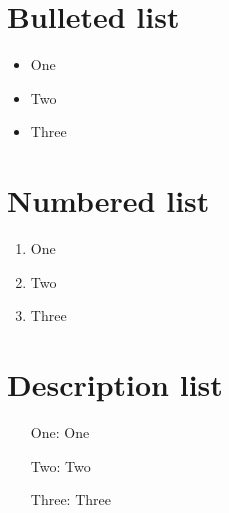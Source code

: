 \documentclass{article}
\begin{document}
\section*{Bulleted list}

\begin{itemize}
\item One
\item Two
\item Three
\end{itemize}

\section*{Numbered list}

\begin{enumerate}
	\item One
	\item Two
	\item Three
\end{enumerate}

\section*{Description list}

\begin{itemize}
	\item[One:] One
	\item[Two:] Two
	\item[Three:] Three
\end{itemize}
	
\end{document}
